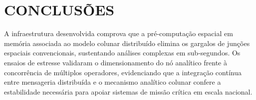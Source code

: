 \section*{CONCLUSÕES}

A infraestrutura desenvolvida comprova que a pré-computação espacial em memória associada ao modelo colunar distribuído elimina os gargalos de junções espaciais convencionais, sustentando análises complexas em sub-segundos. Os ensaios de estresse validaram o dimensionamento do nó analítico frente à concorrência de múltiplos operadores, evidenciando que a integração contínua entre mensageria distribuída e o mecanismo analítico colunar confere a estabilidade necessária para apoiar sistemas de missão crítica em escala nacional.


